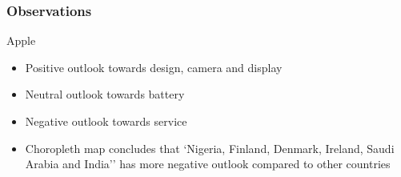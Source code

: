 \documentclass{beamer}
\begin{document}
\begin{frame}
\frametitle{Observations}
{\Large Apple}
\begin{itemize}
\item Positive outlook towards design, camera and display
\item Neutral outlook towards battery
\item Negative outlook towards service
\item Choropleth map concludes that ‘Nigeria, Finland, Denmark, Ireland, Saudi Arabia and India’’ has more negative outlook compared to other countries
\end{itemize}
\end{frame}

 
\end{document}

